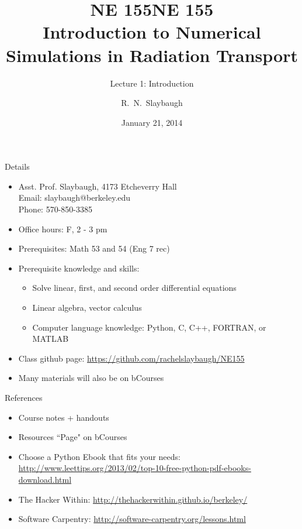 \documentclass[xcolor=x11names,compress]{beamer}
\title{NE 155}
\author{R.\ N.\ Slaybaugh}
\date{January 21, 2014}
\renewcommand{\(}{\begin{columns}}
\renewcommand{\)}{\end{columns}}
\newcommand{\<}[1]{\begin{column}{#1}}
\renewcommand{\>}{\end{column}}
\begin{document}
\begin{frame}
\title{NE 155\\Introduction to Numerical Simulations in Radiation Transport}
\subtitle{Lecture 1: Introduction}
\titlepage
\end{frame}

\begin{frame}{Details}
\begin{itemize}
\item Asst. Prof. Slaybaugh, 4173 Etcheverry Hall\\
      Email: slaybaugh@berkeley.edu \\
      Phone: 570-850-3385
\item Office hours: F, 2 - 3 pm
\item Prerequisites: Math 53 and 54 (Eng 7 rec)
\item Prerequisite knowledge and skills: 
\begin{itemize}
\item Solve linear, first, and second order differential equations
\item Linear algebra, vector calculus
\item Computer language knowledge: Python, C, C++, FORTRAN, or MATLAB	
\end{itemize}
\item Class github page: \href{https://github.com/rachelslaybaugh/NE155}{https://github.com/rachelslaybaugh/NE155}
\item Many materials will also be on bCourses
\end{itemize}
\end{frame}

\begin{frame}{References}
\begin{itemize}
\item Course notes + handouts
\item Resources ``Page" on bCourses
\item Choose a Python Ebook that fits your needs:
\href{http://www.leettips.org/2013/02/top-10-free-python-pdf-ebooks-download.html}{http://www.leettips.org/2013/02/top-10-free-python-pdf-ebooks-download.html}
\item The Hacker Within: \href{http://thehackerwithin.github.io/berkeley/}{http://thehackerwithin.github.io/berkeley/}
\item Software Carpentry: \href{http://software-carpentry.org/lessons.html}{http://software-carpentry.org/lessons.html}
\end{itemize}
\end{frame}
\end{document}
